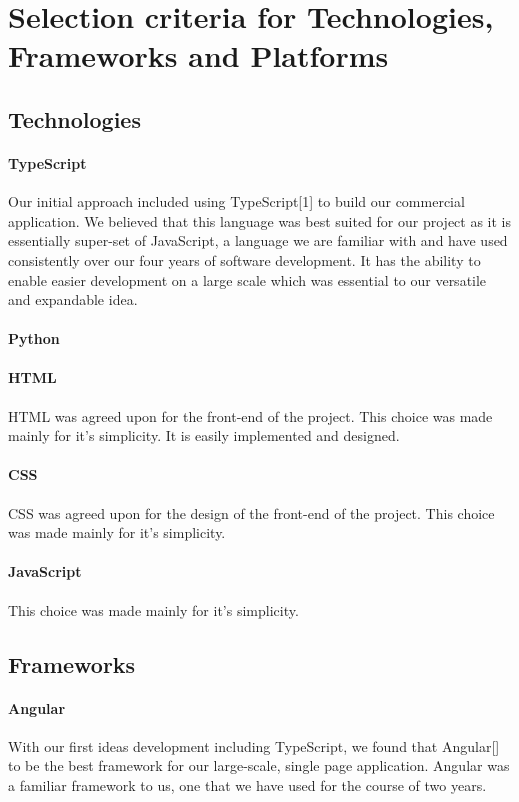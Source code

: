 \section{Selection criteria for Technologies, Frameworks and Platforms}

\subsection{Technologies}
\paragraph{TypeScript}
Our initial approach included using TypeScript[1] to build our commercial application. We believed that this language was best suited for our project as it is essentially super-set of JavaScript, a language we are familiar with and have used consistently over our four years of software development. It has the ability to enable easier development on a large scale which was essential to our versatile and expandable idea\cite{bierman_abadi_torgersen_2014}.

\paragraph{Python}


\paragraph{HTML}
HTML was agreed upon for the front-end of the project. This choice was made mainly for it's simplicity. It is easily implemented and designed.

\paragraph{CSS}
CSS was agreed upon for the design of the front-end of the project. This choice was made mainly for it's simplicity. 

\paragraph{JavaScript}
This choice was made mainly for it's simplicity.

\subsection{Frameworks}
\paragraph{Angular}
With our first ideas development including TypeScript, we found that Angular[] to be the best framework for our large-scale, single page application. Angular was a familiar framework to us, one that we have used for the course of two years.  


